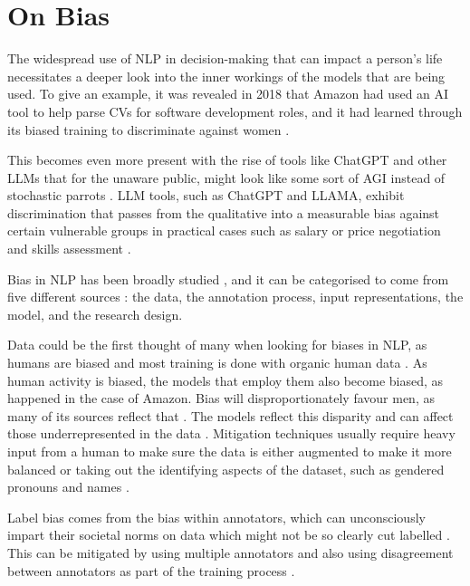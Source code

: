 \chapter{On Bias} \label{app:bias}

The widespread use of NLP in decision-making that can impact a person's life necessitates a deeper look into the inner workings of the models that are being used. To give an example, it was revealed in 2018 that Amazon had used an AI tool to help parse CVs for software development roles, and it had learned through its biased training to discriminate against women \cite{dastin_insight_2018}.

This becomes even more present with the rise of tools like ChatGPT and other LLMs that for the unaware public, might look like some sort of AGI instead of stochastic parrots \cite{bender_dangers_2021}. LLM tools, such as ChatGPT and LLAMA, exhibit discrimination that passes from the qualitative into a measurable bias against certain vulnerable groups in practical cases such as salary or price negotiation and skills assessment \cite{haim_whats_2024}.

Bias in NLP has been broadly studied \cite{lalor_benchmarking_2022,hutchinson_social_2020,garrido-munoz_survey_2021,sun_mitigating_2019},
and it can be categorised to come from five different sources \cite{hovy_five_2021}: the data, the annotation process, input representations, the model, and the research design.

Data could be the first thought of many when looking for biases in NLP, as humans are biased and most training is done with organic human data \cite{zhu_aligning_2015}. As human activity is biased, the models that employ them also become biased, as happened in the case of Amazon. Bias will disproportionately favour men, as many of its sources reflect that \cite{garimella_womens_2019}. The models reflect this disparity and can affect those underrepresented in the data \cite{hovy_demographic_2015}. Mitigation techniques usually require heavy input from a human to make sure the data is either augmented to make it more balanced \cite{webster_mind_2018} or taking out the identifying aspects of the dataset, such as gendered pronouns and names \cite{zhao_gender_2018}.

Label bias comes from the bias within annotators, which can unconsciously impart their societal norms on data which might not be so clearly cut labelled \cite{sap_risk_2019}. This can be mitigated by using multiple annotators \cite{hovy_learning_2013} and also using disagreement between annotators as part of the training process \cite{fornaciari_beyond_2021}.

